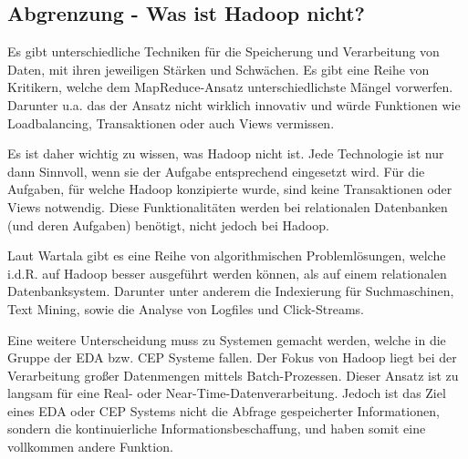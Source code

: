 

\subsection{Abgrenzung - Was ist Hadoop nicht?}
Es gibt unterschiedliche Techniken für die Speicherung und Verarbeitung von Daten, mit ihren jeweiligen Stärken und Schwächen. Es gibt eine Reihe von Kritikern, welche dem MapReduce-Ansatz unterschiedlichste Mängel vorwerfen. Darunter u.a. das der Ansatz nicht wirklich innovativ und würde Funktionen wie Loadbalancing, Transaktionen oder auch Views vermissen.

Es ist daher wichtig zu wissen, was Hadoop nicht ist. Jede Technologie ist nur dann Sinnvoll, wenn sie der Aufgabe entsprechend eingesetzt wird. Für die Aufgaben, für welche Hadoop konzipierte wurde, sind keine Transaktionen oder Views notwendig. Diese Funktionalitäten werden bei relationalen Datenbanken (und deren Aufgaben) benötigt, nicht jedoch bei Hadoop.

Laut Wartala gibt es eine Reihe von algorithmischen Problemlösungen, welche i.d.R. auf Hadoop besser ausgeführt werden können, als auf einem relationalen Datenbanksystem. Darunter unter anderem die Indexierung für Suchmaschinen, Text Mining, sowie die Analyse von Logfiles und Click-Streams.

Eine weitere Unterscheidung muss zu Systemen gemacht werden, welche in die Gruppe der \ac{EDA} bzw. \ac{CEP} Systeme fallen. Der Fokus von Hadoop liegt bei der Verarbeitung großer Datenmengen mittels Batch-Prozessen. Dieser Ansatz ist zu langsam für eine Real- oder Near-Time-Datenverarbeitung. Jedoch ist das Ziel eines \ac{EDA} oder \ac{CEP} Systems nicht die Abfrage gespeicherter Informationen, sondern die kontinuierliche Informationsbeschaffung, und haben somit eine vollkommen andere Funktion.

